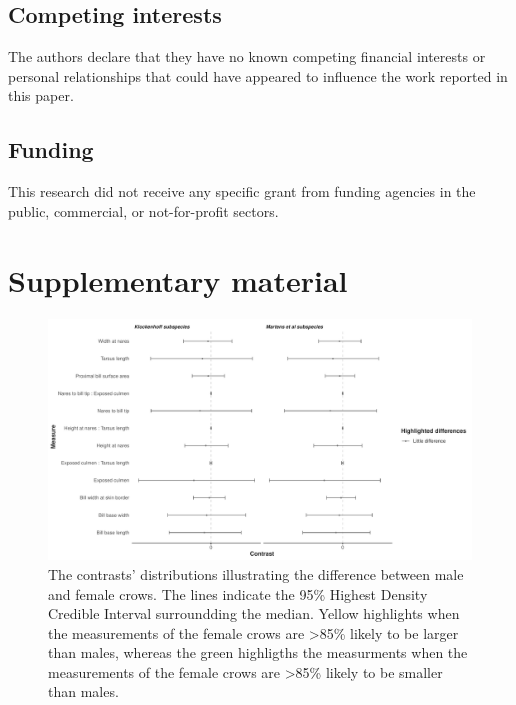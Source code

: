 \documentclass[10pt,a4paper]{article}
\begin{document}
\subsection{Competing interests}\label{competing-interests}

The authors declare that they have no known competing financial interests or personal relationships that could have appeared to influence the work reported in this paper.

\subsection{Funding}\label{funding}

This research did not receive any specific grant from funding agencies in the public, commercial, or not-for-profit sectors.

\clearpage

\section{Supplementary material}\label{supplementary-material}

\begin{figure}
\includegraphics[width=0.9\linewidth]{../Figures/_HDCI_sex_contrasts} \caption{The contrasts' distributions illustrating the difference between male and female crows. The lines indicate the 95\% Highest Density Credible Interval surroundding the median. Yellow highlights when the measurements of the female crows are >85\% likely to be larger than males, whereas the green highligths the measurments when the measurements of the female crows are >85\% likely to be smaller than males.}\label{fig:sexContrasts}
\end{figure}
\end{document}
